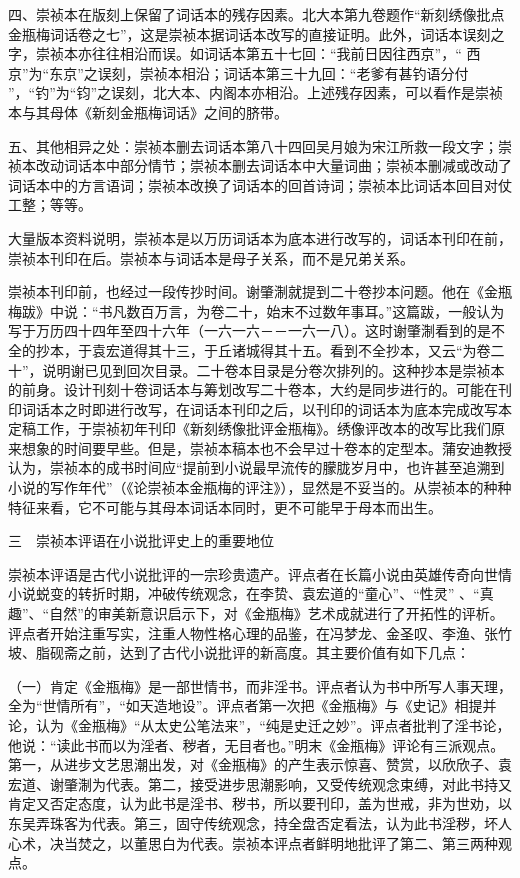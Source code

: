 \documentclass[a4paper,12pt,UTF8,twoside]{ctexbook}
\begin{document}
四、崇祯本在版刻上保留了词话本的残存因素。北大本第九卷题作“新刻绣像批点金瓶梅词话卷之七”，这是崇祯本据词话本改写的直接证明。此外，词话本误刻之字，崇祯本亦往往相沿而误。如词话本第五十七回：“我前日因往西京”，“ 西京”为“东京”之误刻，崇祯本相沿；词话本第三十九回：“老爹有甚钓语分付 ”，“钓”为“钧”之误刻，北大本、内阁本亦相沿。上述残存因素，可以看作是崇祯本与其母体《新刻金瓶梅词话》之间的脐带。

五、其他相异之处：崇祯本删去词话本第八十四回吴月娘为宋江所救一段文字；崇祯本改动词话本中部分情节；崇祯本删去词话本中大量词曲；崇祯本删减或改动了词话本中的方言语词；崇祯本改换了词话本的回首诗词；崇祯本比词话本回目对仗工整；等等。

大量版本资料说明，崇祯本是以万历词话本为底本进行改写的，词话本刊印在前，崇祯本刊印在后。崇祯本与词话本是母子关系，而不是兄弟关系。

崇祯本刊印前，也经过一段传抄时间。谢肇淛就提到二十卷抄本问题。他在《金瓶梅跋》中说：“书凡数百万言，为卷二十，始末不过数年事耳。”这篇跋，一般认为写于万历四十四年至四十六年（一六一六－－一六一八）。这时谢肇淛看到的是不全的抄本，于袁宏道得其十三，于丘诸城得其十五。看到不全抄本，又云“为卷二十”，说明谢已见到回次目录。二十卷本目录是分卷次排列的。这种抄本是崇祯本的前身。设计刊刻十卷词话本与筹划改写二十卷本，大约是同步进行的。可能在刊印词话本之时即进行改写，在词话本刊印之后，以刊印的词话本为底本完成改写本定稿工作，于崇祯初年刊印《新刻绣像批评金瓶梅》。绣像评改本的改写比我们原来想象的时间要早些。但是，崇祯本稿本也不会早过十卷本的定型本。蒲安迪教授认为，崇祯本的成书时间应“提前到小说最早流传的朦胧岁月中，也许甚至追溯到小说的写作年代”（《论崇祯本金瓶梅的评注》），显然是不妥当的。从崇祯本的种种特征来看，它不可能与其母本词话本同时，更不可能早于母本而出生。

三　崇祯本评语在小说批评史上的重要地位

崇祯本评语是古代小说批评的一宗珍贵遗产。评点者在长篇小说由英雄传奇向世情小说蜕变的转折时期，冲破传统观念，在李贽、袁宏道的“童心”、“性灵” 、“真趣”、“自然”的审美新意识启示下，对《金瓶梅》艺术成就进行了开拓性的评析。评点者开始注重写实，注重人物性格心理的品鉴，在冯梦龙、金圣叹、李渔、张竹坡、脂砚斋之前，达到了古代小说批评的新高度。其主要价值有如下几点：

（一）肯定《金瓶梅》是一部世情书，而非淫书。评点者认为书中所写人事天理，全为“世情所有”，“如天造地设”。评点者第一次把《金瓶梅》与《史记》相提并论，认为《金瓶梅》“从太史公笔法来”，“纯是史迁之妙”。评点者批判了淫书论，他说：“读此书而以为淫者、秽者，无目者也。”明末《金瓶梅》评论有三派观点。第一，从进步文艺思潮出发，对《金瓶梅》的产生表示惊喜、赞赏，以欣欣子、袁宏道、谢肇淛为代表。第二，接受进步思潮影响，又受传统观念束缚，对此书持又肯定又否定态度，认为此书是淫书、秽书，所以要刊印，盖为世戒，非为世劝，以东吴弄珠客为代表。第三，固守传统观念，持全盘否定看法，认为此书淫秽，坏人心术，决当焚之，以董思白为代表。崇祯本评点者鲜明地批评了第二、第三两种观点。
\end{document}
